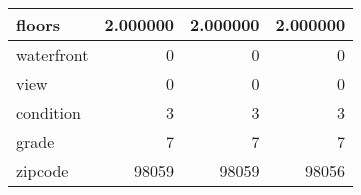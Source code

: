 \begin{table}[H]
\begin{tabular}{|l|r|r|r|}
\hline floors & \cellcolor[rgb]{0.9, 0.54, 0.52} 2.000000 & \cellcolor[rgb]{0.9, 0.54, 0.52} 2.000000 & \cellcolor[rgb]{0.9, 0.54, 0.52} 2.000000 \\
\hline waterfront & \cellcolor[rgb]{0.9, 0.54, 0.52} 0 & \cellcolor[rgb]{0.9, 0.54, 0.52} 0 & \cellcolor[rgb]{0.9, 0.54, 0.52} 0 \\
\hline view & \cellcolor[rgb]{0.9, 0.54, 0.52} 0 & \cellcolor[rgb]{0.9, 0.54, 0.52} 0 & \cellcolor[rgb]{0.9, 0.54, 0.52} 0 \\
\hline condition & \cellcolor[rgb]{0.9, 0.54, 0.52} 3 & \cellcolor[rgb]{0.9, 0.54, 0.52} 3 & \cellcolor[rgb]{0.9, 0.54, 0.52} 3 \\
\hline grade & \cellcolor[rgb]{0.9, 0.54, 0.52} 7 & \cellcolor[rgb]{0.9, 0.54, 0.52} 7 & \cellcolor[rgb]{0.9, 0.54, 0.52} 7 \\
\hline zipcode & \cellcolor[rgb]{0.9, 0.54, 0.52} 98059 & \cellcolor[rgb]{0.9, 0.54, 0.52} 98059 & 98056 \\
\hline
\end{tabular}
\end{table}
